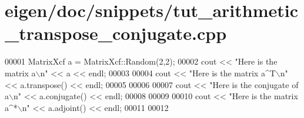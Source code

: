 \hypertarget{eigen_2doc_2snippets_2tut__arithmetic__transpose__conjugate_8cpp_source}{}\section{eigen/doc/snippets/tut\+\_\+arithmetic\+\_\+transpose\+\_\+conjugate.cpp}
\label{eigen_2doc_2snippets_2tut__arithmetic__transpose__conjugate_8cpp_source}

\begin{DoxyCode}
00001 MatrixXcf a = MatrixXcf::Random(2,2);
00002 cout << \textcolor{stringliteral}{"Here is the matrix a\(\backslash\)n"} << a << endl;
00003 
00004 cout << \textcolor{stringliteral}{"Here is the matrix a^T\(\backslash\)n"} << a.transpose() << endl;
00005 
00006 
00007 cout << \textcolor{stringliteral}{"Here is the conjugate of a\(\backslash\)n"} << a.conjugate() << endl;
00008 
00009 
00010 cout << \textcolor{stringliteral}{"Here is the matrix a^*\(\backslash\)n"} << a.adjoint() << endl;
00011 
00012 
\end{DoxyCode}
